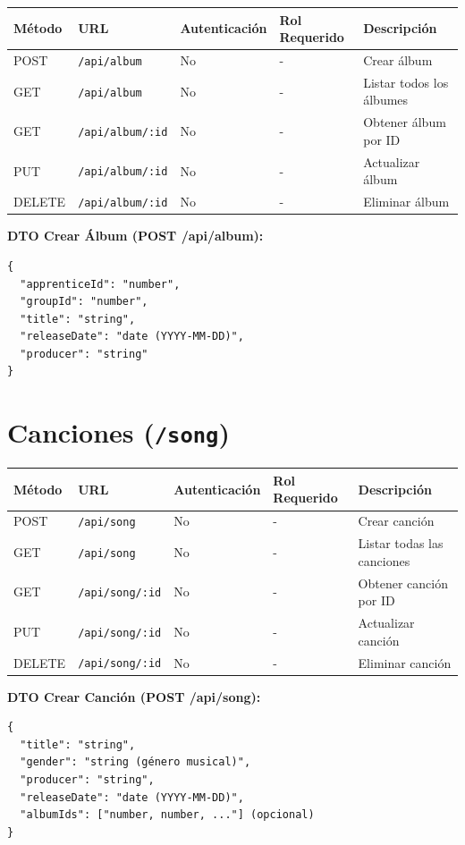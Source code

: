 \documentclass[11pt]{article}
\begin{document}
\begin{longtable}{lllll}
\toprule
\textbf{Método} & \textbf{URL} & \textbf{Autenticación} & \textbf{Rol Requerido} & \textbf{Descripción} \\
\midrule
\endhead
POST & \texttt{/api/album} & No & - & Crear álbum \\
GET & \texttt{/api/album} & No & - & Listar todos los álbumes \\
GET & \texttt{/api/album/:id} & No & - & Obtener álbum por ID \\
PUT & \texttt{/api/album/:id} & No & - & Actualizar álbum \\
DELETE & \texttt{/api/album/:id} & No & - & Eliminar álbum \\
\bottomrule
\end{longtable}

\textbf{DTO Crear Álbum (POST /api/album):}
\begin{Verbatim}
{
  "apprenticeId": "number",
  "groupId": "number",
  "title": "string",
  "releaseDate": "date (YYYY-MM-DD)",
  "producer": "string"
}
\end{Verbatim}

\section{Canciones (\texttt{/song})}

\begin{longtable}{lllll}
\toprule
\textbf{Método} & \textbf{URL} & \textbf{Autenticación} & \textbf{Rol Requerido} & \textbf{Descripción} \\
\midrule
\endhead
POST & \texttt{/api/song} & No & - & Crear canción \\
GET & \texttt{/api/song} & No & - & Listar todas las canciones \\
GET & \texttt{/api/song/:id} & No & - & Obtener canción por ID \\
PUT & \texttt{/api/song/:id} & No & - & Actualizar canción \\
DELETE & \texttt{/api/song/:id} & No & - & Eliminar canción \\
\bottomrule
\end{longtable}

\textbf{DTO Crear Canción (POST /api/song):}
\begin{Verbatim}
{
  "title": "string",
  "gender": "string (género musical)",
  "producer": "string",
  "releaseDate": "date (YYYY-MM-DD)",
  "albumIds": ["number, number, ..."] (opcional)
}
\end{Verbatim}
\end{document}
